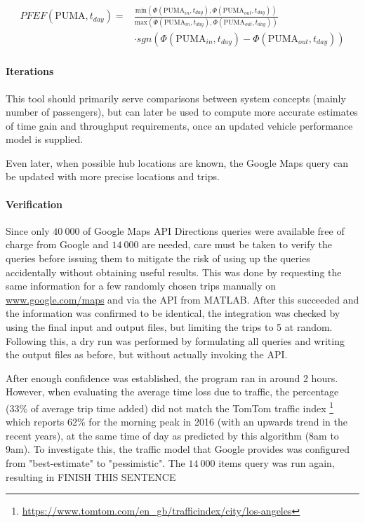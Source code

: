 \begin{align} \label{eq:PFEF}
    \begin{split}
        PFEF(\text{PUMA}, t_{day}) = &\frac{\text{min} 
        \left(
            \Phi(\text{PUMA}_{in}, t_{day}),
            \Phi(\text{PUMA}_{out}, t_{day})
        \right)
        }{\text{max} 
        \left(
            \Phi(\text{PUMA}_{in}, t_{day}),
            \Phi(\text{PUMA}_{out}, t_{day})
        \right)
        } \\
        &\cdot sgn ( \Phi(\text{PUMA}_{in}, t_{day}) - \Phi(\text{PUMA}_{out}, t_{day}) )
    \end{split}
\end{align}

\paragraph{Iterations}

This tool should primarily serve comparisons between system concepts (mainly number of passengers), but can later be used to compute more accurate estimates of time gain and throughput requirements, once an updated vehicle performance model is supplied.

Even later, when possible hub locations are known, the Google Maps query can be updated with more precise locations and trips.


\paragraph{Verification}

Since only $40\ 000$ of Google Maps API Directions queries were available free of charge from Google and $14\ 000$ are needed, care must be taken to verify the queries before issuing them to mitigate the risk of using up the queries accidentally without obtaining useful results. This was done by requesting the same information for a few randomly chosen trips manually on \url{www.google.com/maps} and via the API from MATLAB. After this succeeded and the information was confirmed to be identical, the integration was checked by using the final input and output files, but limiting the trips to 5 at random. Following this, a dry run was performed by formulating all queries and writing the output files as before, but without actually invoking the API. 

After enough confidence was established, the program ran in around 2 hours. However, when evaluating the average time loss due to traffic, the percentage (33\% of average trip time added) did not match the TomTom traffic index \footnote{\url{https://www.tomtom.com/en_gb/trafficindex/city/los-angeles}} which reports 62\% for the morning peak in 2016 (with an upwards trend in the recent years), at the same time of day as predicted by this algorithm (8am to 9am). To investigate this, the traffic model that Google provides was configured from "best-estimate" to "pessimistic". The $14\ 000$ items query was run again, resulting in FINISH THIS SENTENCE


